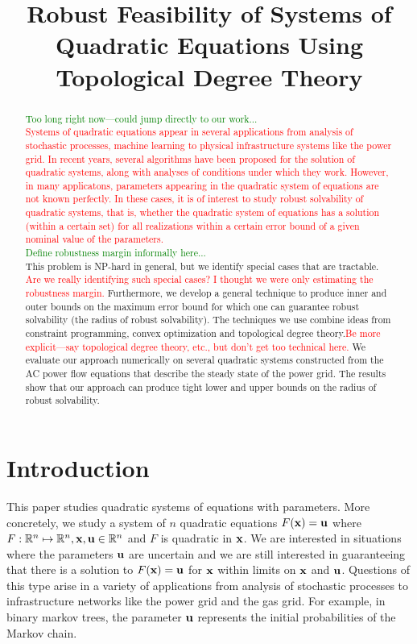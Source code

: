 \documentclass[11pt]{article}
\title{Robust Feasibility of Systems of Quadratic Equations Using Topological Degree Theory}
\theoremstyle{plain}
\theoremstyle{definition}
\theoremstyle{remark}
\newcommand{\delete}[1]{\textcolor{red}{#1}}
\newcommand{\txgr}[1]{\textcolor{green}{#1}}
\begin{document}
\maketitle


\begin{abstract}
  \txgr{Too long right now---could jump directly to our work...}\\
  \delete{Systems of quadratic equations appear in several applications from analysis of stochastic processes, machine learning to physical infrastructure systems like the power grid. In recent years, several algorithms have been proposed for the solution of quadratic systems, along with analyses of conditions under which they work. However, in many applicatons, parameters appearing in the quadratic system of equations are not known perfectly. In these cases, it is of interest to study robust solvability of quadratic systems, that is, whether the quadratic system of equations has a solution (within a certain set) for all realizations within a certain error bound of a given nominal value of the parameters.}\\
  \txgr{Define robustness margin informally here... }\\
  This problem is NP-hard in general, but we identify special cases that are tractable.\delete{ Are we really identifying such special cases? I thought we were only estimating the robustness margin.}
  Furthermore, we develop a general technique to produce inner and outer bounds on the maximum error bound for which one can guarantee robust solvability (the radius of robust solvability).
  The techniques we use combine ideas from constraint programming, convex optimization and topological degree theory.\delete{Be more explicit---say topological degree theory, etc., but don't get too technical here.}
  We evaluate our approach numerically on several quadratic systems constructed from the AC power flow equations that describe the steady state of the power grid.
  The results show that our approach can produce tight lower and upper bounds on the radius of robust solvability.
\end{abstract}

\section{Introduction}
  This paper studies quadratic systems of equations with parameters.
  More concretely, we study a system of $n$ quadratic equations $F(\bold x)=\bold u$ where $F: \mathbb{R}^n \mapsto \mathbb{R}^n,\bold  x,\bold u \in \mathbb{R}^n$ and $F$ is quadratic in $\bold x$.
  We are interested in situations where the parameters $\bold u$ are uncertain and we are still interested in guaranteeing that there is a solution to $F(\bold x) = \bold u$ for $\bold x$ within limits on $\bold x$ and $\bold u$.
  Questions of this type arise in a variety of applications from analysis of stochastic processes to infrastructure networks like the power grid and the gas grid.
  For example, in binary markov trees, the parameter $\bold u$ represents the initial probabilities of the Markov chain.
  
\end{document}
